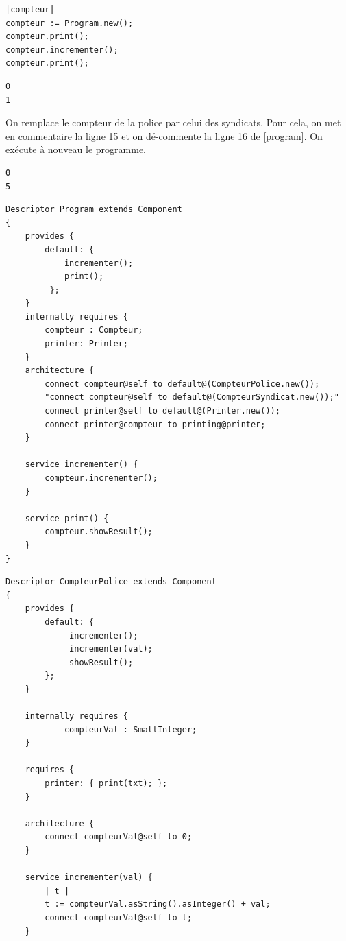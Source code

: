 \documentclass[11pt,a4paper,openany,oneside]{book}
\begin{document}
\begin{appendices}
\newpage

\begin{lstlisting}[language=Compo, frame=single, caption=worspace]
|compteur|
compteur := Program.new();
compteur.print();
compteur.incrementer();
compteur.print();
\end{lstlisting}

\begin{lstlisting}[language=Compo, frame=single, caption=output (Avec le \texttt{CompteurPolice})]
0
1
\end{lstlisting}

On remplace le compteur de la police par celui des syndicats. Pour cela, on met en commentaire la ligne 15 et on dé-commente la ligne 16 de \ref{program}. On exécute à nouveau le programme.

\begin{lstlisting}[language=Compo, frame=single, caption=output (Avec le \texttt{CompteurSyndicat})]
0
5
\end{lstlisting}


\begin{lstlisting}[language=Compo, frame=single, caption=Programme utilisant un compteur, label=program]
Descriptor Program extends Component
{
	provides {
		default: {
			incrementer();
			print();
		 };
	}
	internally requires {
		compteur : Compteur;
		printer: Printer;
	}
	architecture {
        connect compteur@self to default@(CompteurPolice.new());
	    "connect compteur@self to default@(CompteurSyndicat.new());"
        connect printer@self to default@(Printer.new());
        connect printer@compteur to printing@printer;
	}
	
	service incrementer() {
		compteur.incrementer();
	}
	
	service print() {
		compteur.showResult();
	}
}
\end{lstlisting}

\newpage
\begin{lstlisting}[language=Compo, frame=single, caption=Compteur de la Police]
Descriptor CompteurPolice extends Component
{
	provides {
		default: {
			 incrementer(); 
			 incrementer(val); 
			 showResult();
		};
	}
	
	internally requires {
			compteurVal : SmallInteger;
	}
	
	requires {
		printer: { print(txt); };
	}
	
	architecture {
	    connect compteurVal@self to 0;
	}
	
	service incrementer(val) {
	    | t |
	    t := compteurVal.asString().asInteger() + val;
	    connect compteurVal@self to t;
	}
	

\end{lstlisting}
\end{appendices}
\end{document}
